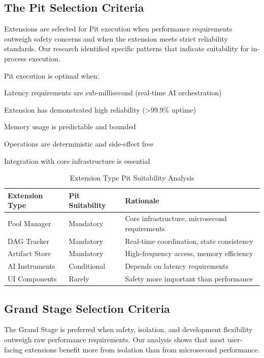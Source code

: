 \subsection*{The Pit Selection Criteria}

Extensions are selected for Pit execution when performance requirements outweigh safety concerns and when the extension meets strict reliability standards. Our research identified specific patterns that indicate suitability for in-process execution.

Pit execution is optimal when:

\begin{compactlist}
    \item Latency requirements are sub-millisecond (real-time AI orchestration)
    \item Extension has demonstrated high reliability (>99.9\% uptime)
    \item Memory usage is predictable and bounded
    \item Operations are deterministic and side-effect free
    \item Integration with core infrastructure is essential
\end{compactlist}

\begin{table}[ht]
\centering
\begin{tabular}{@{}lll@{}}
\toprule
\textbf{Extension Type} & \textbf{Pit Suitability} & \textbf{Rationale} \\
\midrule
Pool Manager & Mandatory & Core infrastructure, microsecond requirements \\
DAG Tracker & Mandatory & Real-time coordination, state consistency \\
Artifact Store & Mandatory & High-frequency access, memory efficiency \\
AI Instruments & Conditional & Depends on latency requirements \\
UI Components & Rarely & Safety more important than performance \\
\bottomrule
\end{tabular}
\caption{Extension Type Pit Suitability Analysis}
\end{table}

\subsection*{Grand Stage Selection Criteria}

The Grand Stage is preferred when safety, isolation, and development flexibility outweigh raw performance requirements. Our analysis shows that most user-facing extensions benefit more from isolation than from microsecond performance.

